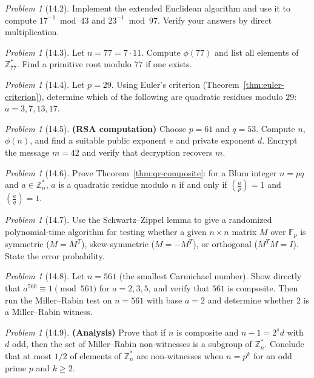 \documentclass[twoside,12pt]{book}
\theoremstyle{plain}
\theoremstyle{definition}
\theoremstyle{remark}
\newtheorem{problem}[theorem]{Problem}
\begin{document}
\begin{problem}[14.2]
Implement the extended Euclidean algorithm and use it to compute $17^{-1} \bmod 43$ and $23^{-1} \bmod 97$. Verify your answers by direct multiplication.
\end{problem}

\begin{problem}[14.3]
Let $n = 77 = 7 \cdot 11$. Compute $\phi(77)$ and list all elements of $\mathbb{Z}_{77}^*$. Find a primitive root modulo $77$ if one exists.
\end{problem}

\begin{problem}[14.4]
Let $p = 29$. Using Euler's criterion (Theorem~\ref{thm:euler-criterion}), determine which of the following are quadratic residues modulo $29$: $a = 3, 7, 13, 17$.
\end{problem}

\begin{problem}[14.5]
\textbf{(RSA computation)} Choose $p = 61$ and $q = 53$. Compute $n$, $\phi(n)$, and find a suitable public exponent $e$ and private exponent $d$. Encrypt the message $m = 42$ and verify that decryption recovers $m$.
\end{problem}

\begin{problem}[14.6]
Prove Theorem~\ref{thm:qr-composite}: for a Blum integer $n = pq$ and $a \in \mathbb{Z}_n^*$, $a$ is a quadratic residue modulo $n$ if and only if $\left(\frac{a}{p}\right) = 1$ and $\left(\frac{a}{q}\right) = 1$.
\end{problem}

\begin{problem}[14.7]
Use the Schwartz--Zippel lemma to give a randomized polynomial-time algorithm for testing whether a given $n \times n$ matrix $M$ over $\mathbb{F}_p$ is symmetric ($M = M^T$), skew-symmetric ($M = -M^T$), or orthogonal ($M^T M = I$). State the error probability.
\end{problem}

\begin{problem}[14.8]
Let $n = 561$ (the smallest Carmichael number). Show directly that $a^{560} \equiv 1 \pmod{561}$ for $a = 2, 3, 5$, and verify that $561$ is composite. Then run the Miller--Rabin test on $n = 561$ with base $a = 2$ and determine whether $2$ is a Miller--Rabin witness.
\end{problem}

\begin{problem}[14.9]
\textbf{(Analysis)} Prove that if $n$ is composite and $n - 1 = 2^s d$ with $d$ odd, then the set of Miller--Rabin non-witnesses is a subgroup of $\mathbb{Z}_n^*$. Conclude that at most $1/2$ of elements of $\mathbb{Z}_n^*$ are non-witnesses when $n = p^k$ for an odd prime $p$ and $k \geq 2$.
\end{problem}
\end{document}

